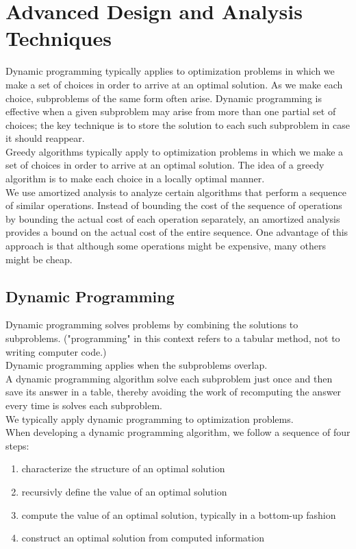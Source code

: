 \documentclass[11pt]{article}
\begin{document}
\section{Advanced Design and Analysis Techniques}
\label{sec-5}
Dynamic programming typically applies to optimization problems in which we make a set of choices in order to arrive at an optimal solution. As we make each choice, subproblems of the same form often arise. Dynamic programming is effective when a given subproblem may arise from more than one partial set of choices; the key technique is to store the solution to each such subproblem in case it should reappear. \\

Greedy algorithms typically apply to optimization problems in which we make a set of choices in order to arrive at an optimal solution. The idea of a greedy algorithm is to make each choice in a locally optimal manner. \\

We use amortized analysis to analyze certain algorithms that perform a sequence of similar operations. Instead of bounding the cost of the sequence of operations by bounding the actual cost of each operation separately, an amortized analysis provides a bound on the actual cost of the entire sequence. One advantage of this approach is that although some operations might be expensive, many others might be cheap. \\
\subsection{Dynamic Programming}
\label{sec-5-1}
Dynamic programming solves problems by combining the solutions to subproblems. ("programming" in this context refers to a tabular method, not to writing computer code.) \\
Dynamic programming applies when the subproblems overlap. \\
A dynamic programming algorithm solve each subproblem just once and then save its answer in a table, thereby avoiding the work of recomputing the answer every time is solves each subproblem. \\

We typically apply dynamic programming to optimization problems. \\

When developing a dynamic programming algorithm, we follow a sequence of four steps: \\
\begin{enumerate}
\item characterize the structure of an optimal solution \\
\item recursivly define the value of an optimal solution \\
\item compute the value of an optimal solution, typically in a bottom-up fashion \\
\item construct an optimal solution from computed information \\
\end{enumerate}
\end{document}
